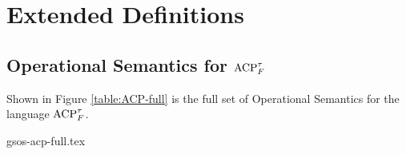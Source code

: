\documentclass[../hons_project.tex]{subfiles}
\begin{document}
\section{Extended Definitions}
\subsection{Operational Semantics for \texorpdfstring{$\mathrm{ACP}_{F}^{\tau}$}{acptf}}\label{ssec:acptf-sos-full}

Shown in Figure \ref{table:ACP-full} is the full set of Operational Semantics for the language $\mathrm{ACP}_{F}^{\tau}$. 

{gsos-acp-full.tex}
\end{document}
